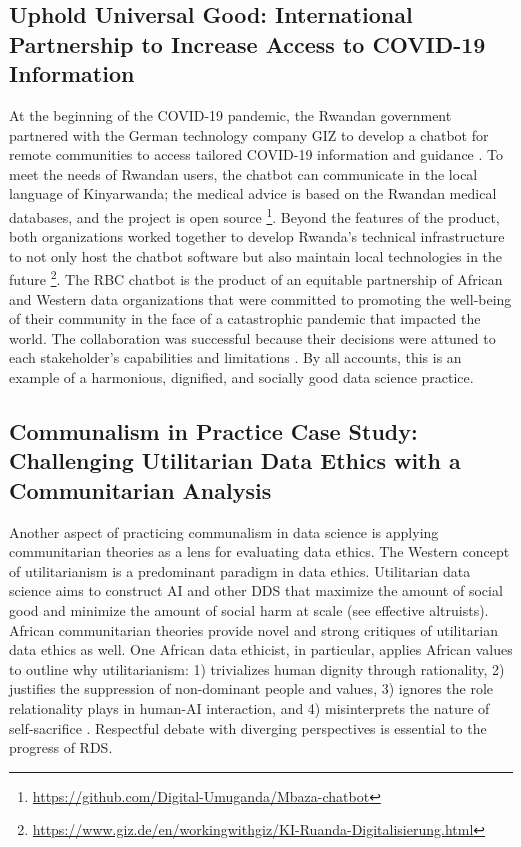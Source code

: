 \subsection{Uphold Universal Good: International Partnership to Increase Access to COVID-19 Information}
At the beginning of the COVID-19 pandemic, the Rwandan government partnered with the German technology company GIZ to develop a chatbot for remote communities to access tailored COVID-19 information and guidance \cite{kohnert2022machine}. To meet the needs of Rwandan users, the chatbot can communicate in the local language of Kinyarwanda; the medical advice is based on the Rwandan medical databases, and the project is open source \footnote{\url{https://github.com/Digital-Umuganda/Mbaza-chatbot}}. Beyond the features of the product, both organizations worked together to develop Rwanda's technical infrastructure to not only host the chatbot software but also maintain local technologies in the future \footnote{\url{https://www.giz.de/en/workingwithgiz/KI-Ruanda-Digitalisierung.html}}. The RBC chatbot is the product of an equitable partnership of African and Western data organizations that were committed to promoting the well-being of their community in the face of a catastrophic pandemic that impacted the world. The collaboration was successful because their decisions were attuned to each stakeholder's capabilities and limitations \cite{kohnert2022machine}. By all accounts, this is an example of a harmonious, dignified, and socially good data science practice.

\subsection{Communalism in Practice Case Study: Challenging Utilitarian Data Ethics with a Communitarian Analysis}
 Another aspect of practicing communalism in data science is applying communitarian theories as a lens for evaluating data ethics. The Western concept of utilitarianism is a predominant paradigm in data ethics. Utilitarian data science aims to construct AI and other DDS that maximize the amount of social good and minimize the amount of social harm at scale (see effective altruists). African communitarian theories provide novel and strong critiques of utilitarian data ethics as well. One African data ethicist, in particular, applies African values to outline why utilitarianism: 1) trivializes human dignity through rationality, 2) justifies the suppression of non-dominant people and values, 3) ignores the role relationality plays in human-AI interaction, and 4) misinterprets the nature of self-sacrifice \cite{metz2021african}. Respectful debate with diverging perspectives is essential to the progress of RDS.


